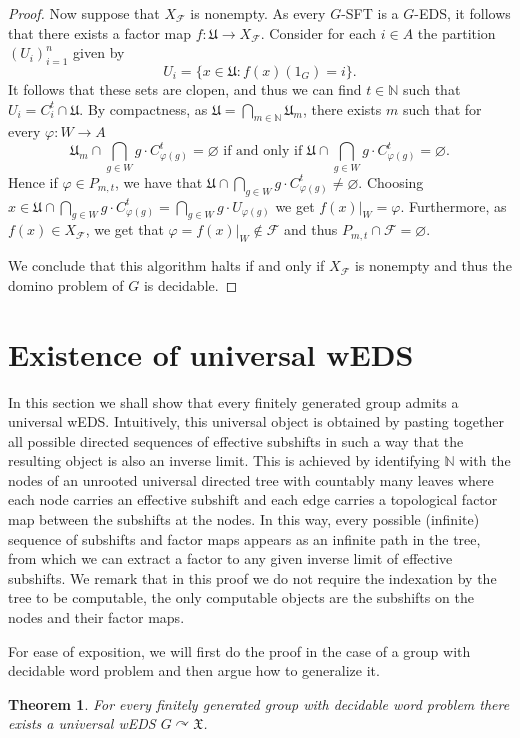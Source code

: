 \documentclass{article}
\newtheorem{theorem}{Theorem}[section]
\theoremstyle{definition}
\theoremstyle{plain}
\newcommand{\NN}{\mathbb{N}}
\newcommand{\FF}{\mathcal{F}}
\begin{document}
\begin{proof}
    Now suppose that $X_{\FF}$ is nonempty. As every $G$-SFT is a $G$-EDS, it follows that there exists a factor map $f\colon \mathfrak{U}\to X_{\FF}$. Consider for each $i \in A$ the partition $(U_i)_{i=1}^n$ given by \[U_i = \{x \in \mathfrak{U} : f(x)(1_G) = i\}.\]
    It follows that these sets are clopen, and thus we can find $t \in \NN$ such that $U_i = C^t_i\cap \mathfrak{U}$. By compactness, as $\mathfrak{U} = \bigcap_{m \in \NN}\mathfrak{U}_m$, there exists $m$ such that for every $\varphi\colon W \to A$ \[ \mathfrak{U}_m\cap \bigcap_{g \in W} g \cdot C^t_{\varphi(g)}   = \varnothing \mbox{ if and only if }  \mathfrak{U} \cap \bigcap_{g \in W} g\cdot C^t_{\varphi(g)}  = \varnothing. \]
    Hence if $\varphi \in P_{m,t}$, we have that $\mathfrak{U}\cap \bigcap_{g \in W} g \cdot C^t_{\varphi(g)}  \neq \varnothing$. Choosing $x \in \mathfrak{U} \cap \bigcap_{g \in W} g\cdot C^t_{\varphi(g)} = \bigcap_{g \in W}g\cdot U_{\varphi(g)}$ we get $f(x)|_W = \varphi$. Furthermore, as $f(x) \in X_{\FF}$, we get that $\varphi = f(x)|_W \notin \FF$ and thus  $P_{m,t} \cap \FF = \varnothing$.
    
    We conclude that this algorithm halts if and only if $X_{\FF}$ is nonempty and thus the domino problem of $G$ is decidable.
    \end{proof}

    \section{Existence of universal wEDS}\label{sec:universal_weds}

    In this section we shall show that every finitely generated group admits a universal wEDS. Intuitively, this universal object is obtained by pasting together all possible directed sequences of effective subshifts in such a way that the resulting object is also an inverse limit. This is achieved by identifying $\NN$ with the nodes of an unrooted universal directed tree with countably many leaves where each node carries an effective subshift and each edge carries a topological factor map between the subshifts at the nodes. In this way, every possible (infinite) sequence of subshifts and factor maps appears as an infinite path in the tree, from which we can extract a factor to any given inverse limit of effective subshifts. We remark that in this proof we do not require the indexation by the tree to be computable, the only computable objects are the subshifts on the nodes and their factor maps.


    For ease of exposition, we will first do the proof in the case of a group with decidable word problem and then argue how to generalize it.
    \begin{theorem}\label{thm:universal_wEDS}
        For every finitely generated group with decidable word problem there exists a universal wEDS $G\curvearrowright \mathfrak{X}$.
    \end{theorem}
\end{document}
